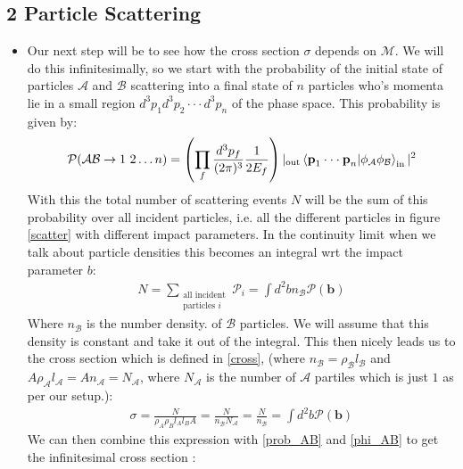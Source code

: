 \documentclass[11pt]{article}
\numberwithin{equation}{section}
\begin{document}
  \subsection{2 Particle Scattering} %
  \label{sub:2_particle_scattering}
  \begin{itemize}
    \item Our next step will be to see how the cross section $\sigma$ depends on $\mathcal{M}$. We will do this infinitesimally, so we start with the probability of the initial state of particles $\mathcal{A}$ and $\mathcal{B}$ scattering into a final state of $n$ particles who's momenta lie in a small region $d^3p_1d^3p_2 \cdot \cdot \cdot d^3p_n$ of the phase space. This probability is given by:
 \begin{align}
 \label{prob_AB}
   \mathcal{P}(\mathcal{A}\mathcal{B}\rightarrow 1~ 2 \ldots n) = \left(\prod_f \frac{d^3p_f}{(2\pi)^3}\frac{1}{2E_f}\right)|{}_{\text{out}}\braket{\textbf{p}_1\cdot \cdot \cdot \textbf{p}_n|\phi_{\mathcal{A}}\phi_{\mathcal{B}}}_{\text{in}}|^2
 \end{align}
 With this the total number of scattering events $N$ will be the sum of this probability over all incident particles, i.e. all the different particles in figure \ref{scatter} with different impact parameters. In the continuity limit when we talk about particle densities this becomes an integral wrt the impact parameter $b$:
 \begin{align}
 \label{no_of_events}
    N =  \sum_{\substack{\text{all incident} \\ \text{particles } i}}\mathcal{P}_i = \int d^2b n_{\mathcal{B}}\mathcal{P}(\textbf{b})
  \end{align} 
  Where $n_{\mathcal{B}}$ is the number density. of $\mathcal{B}$ particles. We will assume that this density is constant and take it out of the integral. This then nicely leads us to the cross section which is defined in \ref{cross}, (where $n_{\mathcal{B}} = \rho_{\mathcal{B}}l_{\mathcal{B}}$ and $A \rho_{\mathcal{A}}l_{\mathcal{A}} = A n_{\mathcal{A}} = N_{\mathcal{A}}$, where $N_{\mathcal{A}}$ is the number of $\mathcal{A}$ partiles which is just $1$ as per our setup.):
  \begin{align*}
    \sigma = \frac{N}{\rho_A\rho_B l_A l_B A} = \frac{N}{n_{\mathcal{B}}N_{\mathcal{A}}} = \frac{N}{n_{\mathcal{B}}} = \int d^2b \mathcal{P}(\textbf{b})
  \end{align*}
  We can then combine this expression with \ref{prob_AB} and \ref{phi_AB} to get the infinitesimal cross section :

\end{itemize}
\end{document}
